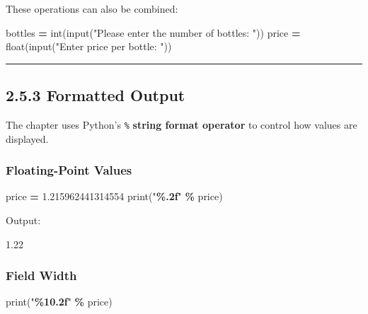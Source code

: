 \documentclass[
]{article}
\newenvironment{Shaded}{\begin{snugshade}}{\end{snugshade}}
\newcommand{\BuiltInTok}[1]{#1}
\newcommand{\FloatTok}[1]{\textcolor[rgb]{0.00,0.00,0.81}{#1}}
\newcommand{\NormalTok}[1]{#1}
\newcommand{\OperatorTok}[1]{\textcolor[rgb]{0.81,0.36,0.00}{\textbf{#1}}}
\newcommand{\SpecialCharTok}[1]{\textcolor[rgb]{0.81,0.36,0.00}{\textbf{#1}}}
\newcommand{\StringTok}[1]{\textcolor[rgb]{0.31,0.60,0.02}{#1}}
\begin{document}
These operations can also be combined:

\begin{Shaded}
\begin{Highlighting}[]
\NormalTok{bottles }\OperatorTok{=} \BuiltInTok{int}\NormalTok{(}\BuiltInTok{input}\NormalTok{(}\StringTok{"Please enter the number of bottles: "}\NormalTok{))}
\NormalTok{price }\OperatorTok{=} \BuiltInTok{float}\NormalTok{(}\BuiltInTok{input}\NormalTok{(}\StringTok{"Enter price per bottle: "}\NormalTok{))}
\end{Highlighting}
\end{Shaded}

\begin{center}\rule{0.5\linewidth}{0.5pt}\end{center}

\subsection{2.5.3 Formatted Output}\label{formatted-output}

The chapter uses Python's \texttt{\%} \textbf{string format operator} to
control how values are displayed.

\subsubsection{Floating-Point Values}\label{floating-point-values}

\begin{Shaded}
\begin{Highlighting}[]
\NormalTok{price }\OperatorTok{=} \FloatTok{1.215962441314554}
\BuiltInTok{print}\NormalTok{(}\StringTok{"}\SpecialCharTok{\%.2f}\StringTok{"} \OperatorTok{\%}\NormalTok{ price)}
\end{Highlighting}
\end{Shaded}

Output:

\begin{Shaded}
\begin{Highlighting}[]
\NormalTok{1.22}
\end{Highlighting}
\end{Shaded}

\subsubsection{Field Width}\label{field-width}

\begin{Shaded}
\begin{Highlighting}[]
\BuiltInTok{print}\NormalTok{(}\StringTok{"}\SpecialCharTok{\%10.2f}\StringTok{"} \OperatorTok{\%}\NormalTok{ price)}
\end{Highlighting}
\end{Shaded}
\end{document}

